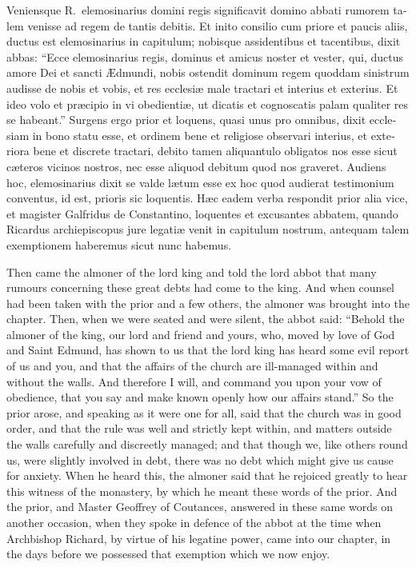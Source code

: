 \documentclass[10pt]{book}
\begin{document}
\begin{paracol}{2}
\begin{otherlanguage}{latin}
Veniensque R.\ elemosinarius domini regis significavit domino abbati rumorem talem venisse ad regem de tantis debitis. Et inito consilio cum priore et paucis aliis, ductus est elemosinarius in capitulum; nobisque assidentibus et tacentibus, dixit abbas: ``Ecce elemosinarius regis, dominus et amicus noster et vester, qui, ductus amore Dei et sancti \AE{}dmundi, nobis ostendit dominum regem quoddam sinistrum audisse de nobis et vobis, et res ecclesi\ae{} male tractari et interius et exterius. Et ideo volo et pr\ae{}cipio in vi obedienti\ae{}, ut dicatis et cognoscatis palam qualiter res se habeant.'' Surgens ergo prior et loquens, quasi unus pro omnibus, dixit ecclesiam in bono statu esse, et ordinem bene et religiose observari interius, et exteriora bene et discrete tractari, debito tamen aliquantulo obligatos nos esse sicut c\ae{}teros vicinos nostros, nec esse aliquod debitum quod nos graveret. Audiens hoc, elemosinarius dixit se valde l\ae{}tum esse ex hoc quod audierat testimonium conventus, id est, prioris sic loquentis. H\ae{}c eadem verba respondit prior alia vice, et magister Galfridus de Constantino, loquentes et excusantes abbatem, quando Ricardus archiepiscopus jure legati\ae{} venit in capitulum nostrum, antequam talem exemptionem haberemus sicut nunc habemus.
\end{otherlanguage}

\switchcolumn

Then came the almoner of the lord king and told the lord abbot that many rumours concerning these great debts had come to the king. And when counsel had been taken with the prior and a few others, the almoner was brought into the chapter. Then, when we were seated and were silent, the abbot said: ``Behold the almoner of the king, our lord and friend and yours, who, moved by love of God and Saint Edmund, has shown to us that the lord king has heard some evil report of us and you, and that the affairs of the church are ill-­managed within and without the walls. And therefore I will, and command you upon your vow of obedience, that you say and make known openly how our affairs stand.'' So the prior arose, and speaking as it were one for all, said that the church was in good order, and that the rule was well and strictly kept within, and matters outside the walls carefully and discreetly managed; and that though we, like others round us, were slightly involved in debt, there was no debt which might give us cause for anxiety. When he heard this, the almoner said that he rejoiced greatly to hear this witness of the monastery, by which he meant these words of the prior. And the prior, and Master Geoffrey of Coutances, answered in these same words on another occasion, when they spoke in defence of the abbot at the time when Archbishop Richard, by virtue of his legatine power, came into our chapter, in the days before we possessed that exemption which we now enjoy.


\end{paracol}
\end{document}
